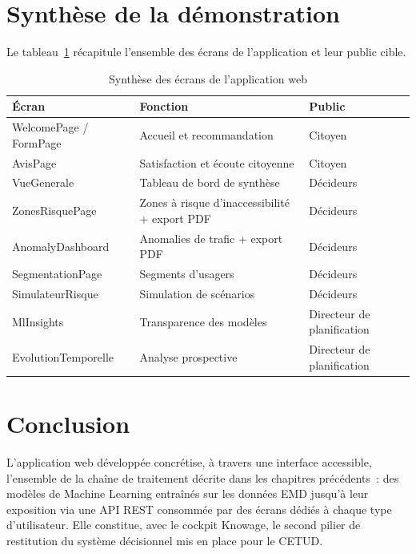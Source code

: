 \section{Synthèse de la démonstration}
Le tableau~\ref{tab:demo_synth} récapitule l'ensemble des écrans de l'application et leur public cible.

\begin{table}[H]
\centering
\caption{Synthèse des écrans de l'application web}
\label{tab:demo_synth}
\begin{tabular}{p{3.5cm}p{5cm}p{4cm}}
\toprule
\textbf{Écran} & \textbf{Fonction} & \textbf{Public} \\
\midrule
WelcomePage / FormPage & Accueil et recommandation & Citoyen \\
AvisPage & Satisfaction et écoute citoyenne & Citoyen \\
VueGenerale & Tableau de bord de synthèse & Décideurs \\
ZonesRisquePage & Zones à risque d'inaccessibilité + export PDF & Décideurs \\
AnomalyDashboard & Anomalies de trafic + export PDF & Décideurs \\
SegmentationPage & Segments d'usagers & Décideurs \\
SimulateurRisque & Simulation de scénarios & Décideurs \\
MlInsights & Transparence des modèles & Directeur de planification \\
EvolutionTemporelle & Analyse prospective & Directeur de planification \\
\bottomrule
\end{tabular}
\end{table}

\section{Conclusion}
L'application web développée concrétise, à travers une interface accessible, l'ensemble de la chaîne de traitement décrite dans les chapitres précédents~: des modèles de Machine Learning entraînés sur les données EMD jusqu'à leur exposition via une API REST consommée par des écrans dédiés à chaque type d'utilisateur. Elle constitue, avec le cockpit Knowage, le second pilier de restitution du système décisionnel mis en place pour le CETUD.

\clearpage
